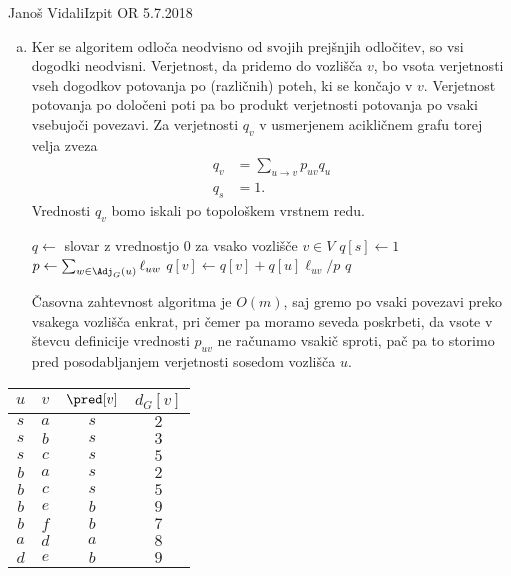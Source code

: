 \begin{naloga}{Janoš Vidali}{Izpit OR 5.7.2018}
\begin{odgovor}
\begin{enumerate}[(a)]
\item Ker se algoritem odloča neodvisno od svojih prejšnjih odločitev,
so vsi dogodki neodvisni.
Verjetnost, da pridemo do vozlišča $v$,
bo vsota verjetnosti vseh dogodkov potovanja po (različnih) poteh,
ki se končajo v $v$.
Verjetnost potovanja po določeni poti pa bo produkt verjetnosti potovanja po vsaki vsebujoči povezavi.
Za verjetnosti $q_v$ v usmerjenem acikličnem grafu torej velja zveza
\begin{align*}
q_v &= \sum_{u \rightarrow v}p_{uv} q_u \\
q_s &= 1.
\end{align*}
Vrednosti $q_v$ bomo iskali po topološkem vrstnem redu.
\begin{small}
\begin{algorithmic}
	\State $q \gets$ slovar z vrednostjo $0$ za vsako vozlišče $v \in V$
	\State $q[s] \gets 1$
        \State $p \gets \sum_{w \in \Adj_G(u)} \ell_{uw}$
			\State $q[v] \gets q[v] + q[u] \ell_{uv} / p$
		\EndFor
	\EndFor
    \State \Return $q$
\EndFunction
\end{algorithmic}
\end{small}
Časovna zahtevnost algoritma je $O(m)$, 
saj gremo po vsaki povezavi preko vsakega vozlišča enkrat, 
pri čemer pa moramo seveda poskrbeti,
da vsote v števcu definicije vrednosti $p_{uv}$ ne računamo vsakič sproti,
pač pa to storimo pred posodabljanjem verjetnosti sosedom vozlišča $u$.
\end{enumerate}
%
\begin{slika}
\end{slika}
%
\begin{tabela}
\begin{tabular}{cc|cc}
$u$ & $v$ & $\pred[v]$ & $d_G[v]$ \\ \hline
$ s$ & $a$ & $s$ & $2$ \\
$ s$ & $b$ & $s$ & $3$ \\
$ s$ & $c$ & $s$ & $5$ \\
$ b$ & $a$ & $s$ & $2$ \\
$ b$ & $c$ & $s$ & $5$ \\
$ b$ & $e$ & $b$ & $9$ \\
$ b$ & $f$ & $b$ & $7$ \\
$ a$ & $d$ & $a$ & $8$ \\
$ d$ & $e$ & $b$ & $9$ \\

\end{tabular}
\end{tabela}
\end{odgovor}
\end{naloga}
